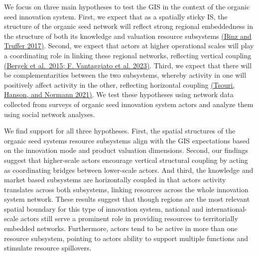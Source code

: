 \documentclass[twoside,12pt,final]{ucthesis-CA2012}
\begin{document}
\begin{ucmainmatter}
We focus on three main hypotheses to test the GIS in the context of the
organic seed innovation system. First, we expect that as a spatially
sticky IS, the structure of the organic seed network will reflect strong
regional embeddedness in the structure of both its knowledge and
valuation resource subsystems \href{https://www.zotero.org/google-docs/?9Wn62j}{(Binz and Truffer
2017)}. Second, we expect
that actors at higher operational scales will play a coordinating role
in linking these regional networks, reflecting vertical coupling
\href{https://www.zotero.org/google-docs/?EIQQAJ}{(Bergek et al.~2015; F. Vantaggiato et al.
2023)}. Third, we expect
that there will be complementarities between the two subsystems, whereby
activity in one will positively affect activity in the other, reflecting
horizontal coupling \href{https://www.zotero.org/google-docs/?7ws6HY}{(Tsouri, Hanson, and Normann
2021)}. We test these
hypotheses using network data collected from surveys of organic seed
innovation system actors and analyze them using social network analyses.

We find support for all three hypotheses. First, the spatial structures
of the organic seed system\textquotesingle s resource subsystems align with the GIS
expectations based on the innovation mode and product valuation
dimensions. Second, our findings suggest that higher-scale actors
encourage vertical structural coupling by acting as coordinating bridges
between lower-scale actors. And third, the knowledge and market based
subsystems are horizontally coupled in that actors\textquotesingle{} activity translates
across both subsystems, linking resources across the whole innovation
system network. These results suggest that though regions are the most
relevant spatial boundary for this type of innovation system, national
and international-scale actors still serve a prominent role in providing
resources to territorially embedded networks. Furthermore, actors tend
to be active in more than one resource subsystem, pointing to actors\textquotesingle{}
ability to support multiple functions and stimulate resource spillovers.


\end{ucmainmatter}
\end{document}
